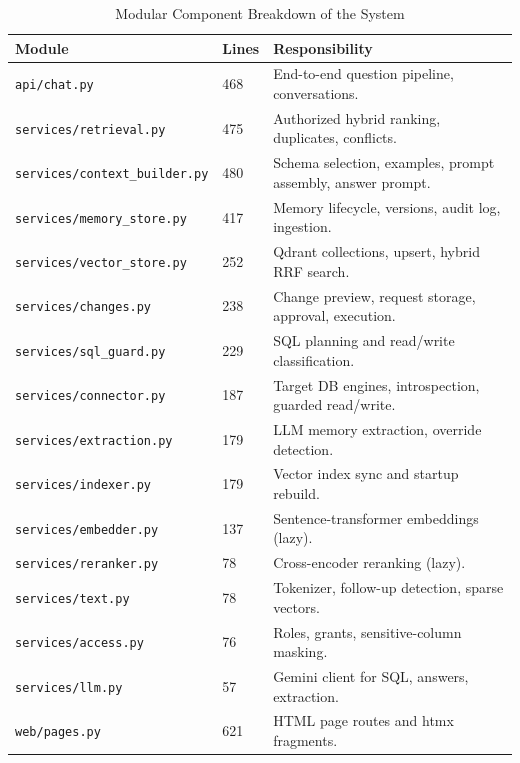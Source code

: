 \begin{table}[H]
    \centering
    \small
    \caption{Modular Component Breakdown of the System}
    \begin{tabular}{p{6.5cm} p{0.9cm} p{7.4cm}}
        \toprule
        \textbf{Module} & \textbf{Lines} & \textbf{Responsibility} \\
        \midrule
        \texttt{api/chat.py}                  & 468 & End-to-end question pipeline, conversations. \\[3pt]
        \texttt{services/retrieval.py}        & 475 & Authorized hybrid ranking, duplicates, conflicts. \\[3pt]
        \texttt{services/context\_builder.py} & 480 & Schema selection, examples, prompt assembly, answer prompt. \\[3pt]
        \texttt{services/memory\_store.py}    & 417 & Memory lifecycle, versions, audit log, ingestion. \\[3pt]
        \texttt{services/vector\_store.py}    & 252 & Qdrant collections, upsert, hybrid RRF search. \\[3pt]
        \texttt{services/changes.py}          & 238 & Change preview, request storage, approval, execution. \\[3pt]
        \texttt{services/sql\_guard.py}       & 229 & SQL planning and read/write classification. \\[3pt]
        \texttt{services/connector.py}        & 187 & Target DB engines, introspection, guarded read/write. \\[3pt]
        \texttt{services/extraction.py}       & 179 & LLM memory extraction, override detection. \\[3pt]
        \texttt{services/indexer.py}          & 179 & Vector index sync and startup rebuild. \\[3pt]
        \texttt{services/embedder.py}         & 137 & Sentence-transformer embeddings (lazy). \\[3pt]
        \texttt{services/reranker.py}         &  78 & Cross-encoder reranking (lazy). \\[3pt]
        \texttt{services/text.py}             &  78 & Tokenizer, follow-up detection, sparse vectors. \\[3pt]
        \texttt{services/access.py}           &  76 & Roles, grants, sensitive-column masking. \\[3pt]
        \texttt{services/llm.py}              &  57 & Gemini client for SQL, answers, extraction. \\[3pt]
        \texttt{web/pages.py}                 & 621 & HTML page routes and htmx fragments. \\
        \bottomrule
    \end{tabular}
    \label{tab:modules}
\end{table}

